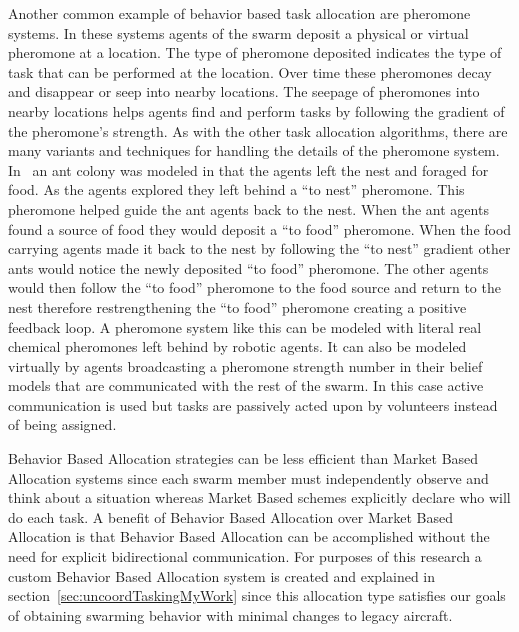 Another common example of behavior based task allocation are pheromone systems.  In these systems agents of the swarm deposit a physical or virtual pheromone at a location.  The type of pheromone deposited indicates the type of task that can be performed at the location.  Over time these pheromones decay and disappear or seep into nearby locations.  The seepage of pheromones into nearby locations helps agents find and perform tasks by following the gradient of the pheromone's strength.  As with the other task allocation algorithms, there are many variants and techniques for handling the details of the pheromone system.  In~\citet{pheromone} an ant colony was modeled in that the agents left the nest and foraged for food.  As the agents explored they left behind a ``to nest'' pheromone.  This pheromone helped guide the ant agents back to the nest.  When the ant agents found a source of food they would deposit a ``to food'' pheromone.  When the food carrying agents made it back to the nest by following the ``to nest'' gradient other ants would notice the newly deposited ``to food'' pheromone.  The other agents would then follow the ``to food'' pheromone to the food source and return to the nest therefore restrengthening the ``to food'' pheromone creating a positive feedback loop.  A pheromone system like this can be modeled with literal real chemical pheromones left behind by robotic agents.  It can also be modeled virtually by agents broadcasting a pheromone strength number in their belief models that are communicated with the rest of the swarm.  In this case active communication is used but tasks are passively acted upon by volunteers instead of being assigned.

Behavior Based Allocation strategies can be less efficient than Market Based Allocation systems since each swarm member must independently observe and think about a situation whereas Market Based schemes explicitly declare who will do each task.  A benefit of Behavior Based Allocation over Market Based Allocation is that Behavior Based Allocation can be accomplished without the need for explicit bidirectional communication.  For purposes of this research a custom Behavior Based Allocation system is created and explained in section~\ref{sec:uncoordTaskingMyWork} since this allocation type satisfies our goals of obtaining swarming behavior with minimal changes to legacy aircraft.